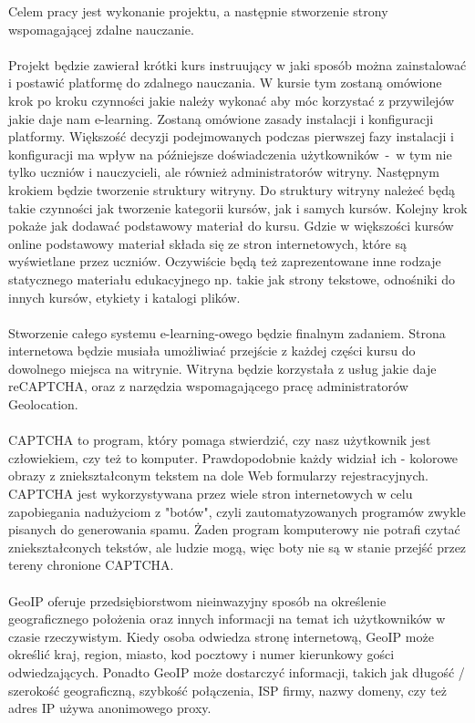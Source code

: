 \hspace{1cm} Celem pracy jest wykonanie projektu, a następnie stworzenie strony wspomagającej zdalne nauczanie. \\
\ \\
Projekt będzie zawierał krótki kurs instruujący w jaki sposób można zainstalować i postawić platformę do zdalnego nauczania. W kursie tym zostaną omówione krok po kroku czynności jakie należy wykonać aby móc korzystać z przywilejów jakie daje nam e-learning. Zostaną omówione zasady instalacji i konfiguracji platformy. Większość decyzji podejmowanych podczas pierwszej fazy instalacji i konfiguracji ma wpływ na późniejsze doświadczenia użytkowników~-~w tym nie tylko uczniów i nauczycieli, ale również administratorów witryny. Następnym krokiem będzie tworzenie struktury witryny. Do struktury witryny należeć będą takie czynności jak tworzenie kategorii kursów, jak i samych kursów. Kolejny krok pokaże jak dodawać podstawowy materiał do kursu. Gdzie w większości kursów online podstawowy materiał składa się ze stron internetowych, które są wyświetlane przez uczniów. Oczywiście będą też zaprezentowane inne rodzaje statycznego materiału edukacyjnego np. takie jak strony tekstowe, odnośniki do innych kursów, etykiety i katalogi plików. \\
\ \\
Stworzenie całego systemu e-learning-owego będzie finalnym zadaniem. Strona internetowa będzie musiała umożliwiać przejście z każdej części kursu do dowolnego miejsca na witrynie. Witryna będzie korzystała z usług jakie daje reCAPTCHA, oraz z narzędzia wspomagającego pracę administratorów Geolocation. \\
\ \\
CAPTCHA to program, który pomaga stwierdzić, czy nasz użytkownik jest człowiekiem, czy też to komputer. Prawdopodobnie każdy widział ich - kolorowe obrazy z zniekształconym tekstem na dole Web formularzy rejestracyjnych. CAPTCHA jest wykorzystywana przez wiele stron internetowych w celu zapobiegania nadużyciom z "botów", czyli zautomatyzowanych programów zwykle pisanych do generowania spamu. Żaden program komputerowy nie potrafi czytać zniekształconych tekstów, ale ludzie mogą, więc boty nie są w stanie przejść przez tereny chronione CAPTCHA. \\
\ \\
GeoIP oferuje przedsiębiorstwom nieinwazyjny sposób na określenie geograficznego położenia oraz innych informacji na temat ich użytkowników w czasie rzeczywistym. Kiedy osoba odwiedza stronę internetową, GeoIP może określić kraj, region, miasto, kod pocztowy i numer kierunkowy gości odwiedzających. Ponadto GeoIP może dostarczyć informacji, takich jak długość / szerokość geograficzną, szybkość połączenia, ISP firmy, nazwy domeny, czy też adres IP używa anonimowego proxy. \\
